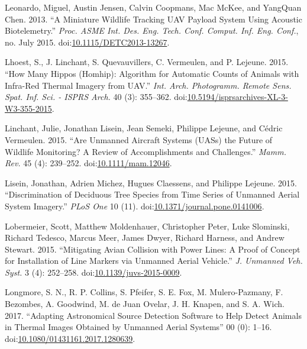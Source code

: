 \documentclass[]{interact}
\theoremstyle{plain}%
\theoremstyle{definition}
\theoremstyle{remark}
\begin{document}
\hypertarget{ref-leonardo_miniature_2013}{}
Leonardo, Miguel, Austin Jensen, Calvin Coopmans, Mac McKee, and
YangQuan Chen. 2013. ``A Miniature Wildlife Tracking UAV Payload System
Using Acoustic Biotelemetry.'' \emph{Proc. ASME Int. Des. Eng. Tech.
Conf. Comput. Inf. Eng. Conf.}, no. July 2015.
doi:\href{https://doi.org/10.1115/DETC2013-13267}{10.1115/DETC2013-13267}.

\hypertarget{ref-lhoest_how_2015}{}
Lhoest, S., J. Linchant, S. Quevauvillers, C. Vermeulen, and P. Lejeune.
2015. ``How Many Hippos (Homhip): Algorithm for Automatic Counts of
Animals with Infra-Red Thermal Imagery from UAV.'' \emph{Int. Arch.
Photogramm. Remote Sens. Spat. Inf. Sci. - ISPRS Arch.} 40 (3):
355--362.
doi:\href{https://doi.org/10.5194/isprsarchives-XL-3-W3-355-2015}{10.5194/isprsarchives-XL-3-W3-355-2015}.

\hypertarget{ref-linchant_are_2015}{}
Linchant, Julie, Jonathan Lisein, Jean Semeki, Philippe Lejeune, and
Cédric Vermeulen. 2015. ``Are Unmanned Aircraft Systems (UASs) the
Future of Wildlife Monitoring? A Review of Accomplishments and
Challenges.'' \emph{Mamm. Rev.} 45 (4): 239--252.
doi:\href{https://doi.org/10.1111/mam.12046}{10.1111/mam.12046}.

\hypertarget{ref-lisein_discrimination_2015}{}
Lisein, Jonathan, Adrien Michez, Hugues Claessens, and Philippe Lejeune.
2015. ``Discrimination of Deciduous Tree Species from Time Series of
Unmanned Aerial System Imagery.'' \emph{PLoS One} 10 (11).
doi:\href{https://doi.org/10.1371/journal.pone.0141006}{10.1371/journal.pone.0141006}.

\hypertarget{ref-lobermeier_mitigating_2015}{}
Lobermeier, Scott, Matthew Moldenhauer, Christopher Peter, Luke
Slominski, Richard Tedesco, Marcus Meer, James Dwyer, Richard Harness,
and Andrew Stewart. 2015. ``Mitigating Avian Collision with Power Lines:
A Proof of Concept for Installation of Line Markers via Unmanned Aerial
Vehicle.'' \emph{J. Unmanned Veh. Syst.} 3 (4): 252--258.
doi:\href{https://doi.org/10.1139/juvs-2015-0009}{10.1139/juvs-2015-0009}.

\hypertarget{ref-longmore_adapting_2017}{}
Longmore, S. N., R. P. Collins, S. Pfeifer, S. E. Fox, M.
Mulero-Pazmany, F. Bezombes, A. Goodwind, M. de Juan Ovelar, J. H.
Knapen, and S. A. Wich. 2017. ``Adapting Astronomical Source Detection
Software to Help Detect Animals in Thermal Images Obtained by Unmanned
Aerial Systems'' 00 (0): 1--16.
doi:\href{https://doi.org/10.1080/01431161.2017.1280639}{10.1080/01431161.2017.1280639}.
\end{document}
